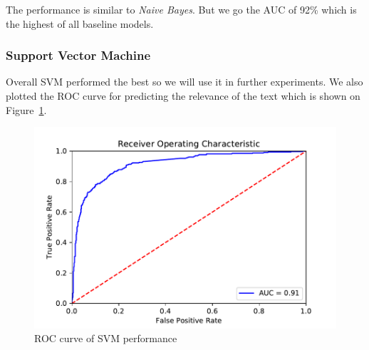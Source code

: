 \documentclass[11pt,a4paper]{article}
\begin{document}
The performance is similar to \textit{Naive Bayes}.
But we go the AUC of 92\% which is the highest of all baseline models.

\subsubsection{Support Vector Machine}


Overall SVM performed the best so we will use it in further experiments.
We also plotted the ROC curve for predicting the relevance of the text which is shown on Figure~\ref{fig:fig2}.

\begin{figure}[h]
    \centering
    \includegraphics[width=1.0\columnwidth]{Figures/rocsvm.pdf}
    \caption{ROC curve of SVM performance}
    \label{fig:fig2}
\end{figure}
\end{document}
